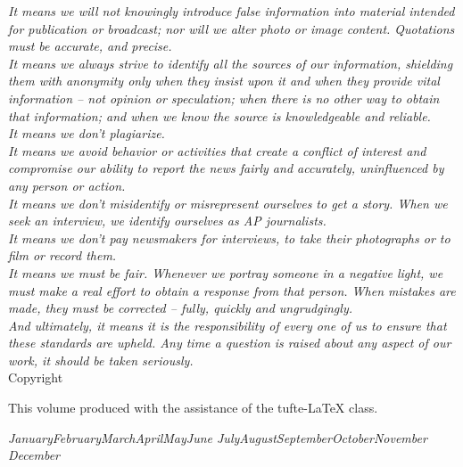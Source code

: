 \documentclass[symmetric, notoc, nobib]{towcenter-book}
\newcommand{\monthyear}{%
  \ifcase\month\or January\or February\or March\or April\or May\or June\or
  July\or August\or September\or October\or November\or
  December\fi\space\number\year
}
\begin{document}
\noindent\textit{It means we will not knowingly introduce false information into material intended for publication or broadcast; nor will we alter photo or image content. Quotations must be accurate, and precise.}\\[0.5cm]

\noindent\textit{It means we always strive to identify all the sources of our information, shielding them with anonymity only when they insist upon it and when they provide vital information – not opinion or speculation; when there is no other way to obtain that information; and when we know the source is knowledgeable and reliable.}\\[0.5cm]

\noindent\textit{It means we don't plagiarize.}\\[0.5cm]

\noindent\textit{It means we avoid behavior or activities that create a conflict of interest and compromise our ability to report the news fairly and accurately, uninfluenced by any person or action.}\\[0.5cm]

\noindent\textit{It means we don't misidentify or misrepresent ourselves to get a story. When we seek an interview, we identify ourselves as AP journalists.}\\[0.5cm]

\noindent\textit{It means we don’t pay newsmakers for interviews, to take their photographs or to film or record them.}\\[0.5cm]

\noindent\textit{It means we must be fair. Whenever we portray someone in a negative light, we must make a real effort to obtain a response from that person. When mistakes are made, they must be corrected – fully, quickly and ungrudgingly.}\\[0.5cm]

\noindent\textit{And ultimately, it means it is the responsibility of every one of us to ensure that these standards are upheld. Any time a question is raised about any aspect of our work, it should be taken seriously.}\\[0.5cm]

\noindent \small{Copyright  \the\year\ \thanklessauthor}

\noindent \small{This volume produced with the assistance of the \textsf{tufte-\LaTeX{}} class.}

\noindent\textit{\monthyear}

\tableofcontents
\end{document}
